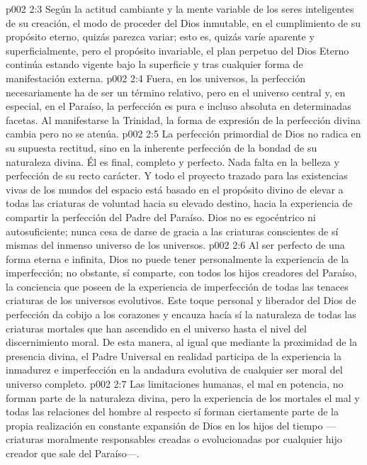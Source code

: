 \vs p002 2:3 \pc Según la actitud cambiante y la mente variable de los seres inteligentes de su creación, el modo de proceder del Dios inmutable, en el cumplimiento de su propósito eterno, quizás parezca variar; esto es, quizás varíe aparente y superficialmente, pero el propósito invariable, el plan perpetuo del Dios Eterno continúa estando vigente bajo la superficie y tras cualquier forma de manifestación externa.
\vs p002 2:4 Fuera, en los universos, la perfección necesariamente ha de ser un término relativo, pero en el universo central y, en especial, en el Paraíso, la perfección es pura e incluso absoluta en determinadas facetas. Al manifestarse la Trinidad, la forma de expresión de la perfección divina cambia pero no se atenúa.
\vs p002 2:5 \pc La perfección primordial de Dios no radica en su supuesta rectitud, sino en la inherente perfección de la bondad de su naturaleza divina. Él es final, completo y perfecto. Nada falta en la belleza y perfección de su recto carácter. Y todo el proyecto trazado para las existencias vivas de los mundos del espacio está basado en el propósito divino de elevar a todas las criaturas de voluntad hacia su elevado destino, hacia la experiencia de compartir la perfección del Padre del Paraíso. Dios no es egocéntrico ni autosuficiente; nunca cesa de darse de gracia a las criaturas conscientes de sí mismas del inmenso universo de los universos.
\vs p002 2:6 Al ser perfecto de una forma eterna e infinita, Dios no puede tener personalmente la experiencia de la imperfección; no obstante, sí comparte, con todos los hijos creadores del Paraíso, la conciencia que poseen de la experiencia de imperfección de todas las tenaces criaturas de los universos evolutivos. Este toque personal y liberador del Dios de perfección da cobijo a los corazones y encauza hacía sí la naturaleza de todas las criaturas mortales que han ascendido en el universo hasta el nivel del discernimiento moral. De esta manera, al igual que mediante la proximidad de la presencia divina, el Padre Universal en realidad participa de la experiencia  la inmadurez e imperfección en la andadura evolutiva de cualquier ser moral del universo completo.
\vs p002 2:7 Las limitaciones humanas, el mal en potencia, no forman parte de la naturaleza divina, pero la experiencia de los mortales  el mal y todas las relaciones del hombre al respecto sí forman ciertamente parte de la propia realización en constante expansión de Dios en los hijos del tiempo ---criaturas moralmente responsables creadas o evolucionadas por cualquier hijo creador que sale del Paraíso---.
